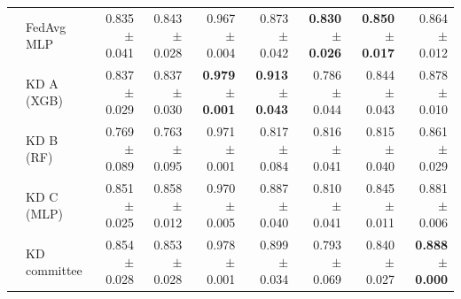 \begin{table}[t]
\begin{tabular}{llrrrrrrr}
 & FedAvg MLP & 0.835 $\pm$ 0.041 & 0.843 $\pm$ 0.028 & 0.967 $\pm$ 0.004 & 0.873 $\pm$ 0.042 & \textbf{0.830 $\pm$ 0.026} & \textbf{0.850 $\pm$ 0.017} & 0.864 $\pm$ 0.012 \\
 & KD A (XGB) & 0.837 $\pm$ 0.029 & 0.837 $\pm$ 0.030 & \textbf{0.979 $\pm$ 0.001} & \textbf{0.913 $\pm$ 0.043} & 0.786 $\pm$ 0.044 & 0.844 $\pm$ 0.043 & 0.878 $\pm$ 0.010 \\
 & KD B (RF) & 0.769 $\pm$ 0.089 & 0.763 $\pm$ 0.095 & 0.971 $\pm$ 0.001 & 0.817 $\pm$ 0.084 & 0.816 $\pm$ 0.041 & 0.815 $\pm$ 0.040 & 0.861 $\pm$ 0.029 \\
 & KD C (MLP) & 0.851 $\pm$ 0.025 & 0.858 $\pm$ 0.012 & 0.970 $\pm$ 0.005 & 0.887 $\pm$ 0.040 & 0.810 $\pm$ 0.041 & 0.845 $\pm$ 0.011 & 0.881 $\pm$ 0.006 \\
 & KD committee & 0.854 $\pm$ 0.028 & 0.853 $\pm$ 0.028 & 0.978 $\pm$ 0.001 & 0.899 $\pm$ 0.034 & 0.793 $\pm$ 0.069 & 0.840 $\pm$ 0.027 & \textbf{0.888 $\pm$ 0.000} \\
\bottomrule
\end{tabular}
\end{table}
